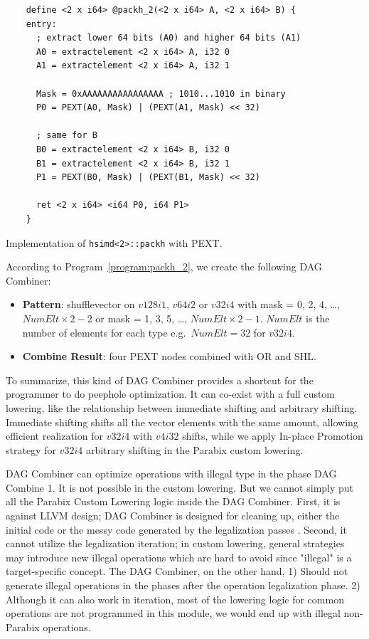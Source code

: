 \begin{program}[htbp!]
\begin{verbatim}
    define <2 x i64> @packh_2(<2 x i64> A, <2 x i64> B) {
    entry:
      ; extract lower 64 bits (A0) and higher 64 bits (A1)
      A0 = extractelement <2 x i64> A, i32 0
      A1 = extractelement <2 x i64> A, i32 1

      Mask = 0xAAAAAAAAAAAAAAAA ; 1010...1010 in binary
      P0 = PEXT(A0, Mask) | (PEXT(A1, Mask) << 32)

      ; same for B
      B0 = extractelement <2 x i64> B, i32 0
      B1 = extractelement <2 x i64> B, i32 1
      P1 = PEXT(B0, Mask) | (PEXT(B1, Mask) << 32)

      ret <2 x i64> <i64 P0, i64 P1>
    }
\end{verbatim}
\caption{Implementation of {\tt hsimd<2>::packh} with PEXT.}
\label{program:packh_2}
\end{program}

According to Program~\ref{program:packh_2}, we create the following DAG Combiner:
\begin{itemize}
    \item \textbf{Pattern}: shufflevector on $v128i1$, $v64i2$ or $v32i4$ with mask = 0, 2, 4, \ldots, $NumElt \times 2-2$ or mask = 1, 3, 5, \ldots, $NumElt \times 2 -1$. $NumElt$ is the number of elements for each type e.g.\ $NumElt=32$ for $v32i4$.
    \item \textbf{Combine Result}: four PEXT nodes combined with OR and SHL.
\end{itemize}

To summarize, this kind of DAG Combiner provides a shortcut for the programmer to do peephole optimization. It can co-exist with a full custom lowering, like the relationship between immediate shifting and arbitrary shifting. Immediate shifting shifts all the vector elements with the same amount, allowing efficient realization for $v32i4$ with $v4i32$ shifts, while we apply In-place Promotion strategy for $v32i4$ arbitrary shifting in the Parabix custom lowering.

DAG Combiner can optimize operations with illegal type in the phase DAG Combine 1. It is not possible in the custom lowering. But we cannot simply put all the Parabix Custom Lowering logic inside the DAG Combiner. First, it is against LLVM design; DAG Combiner is designed for cleaning up, either the initial code or the messy code generated by the legalization passes \cite{llvm_code_gen}. Second, it cannot utilize the legalization iteration; in custom lowering, general strategies may introduce new illegal operations which are hard to avoid since "illegal" is a target-specific concept. The DAG Combiner, on the other hand, 1) Should not generate illegal operations in the phases after the operation legalization phase. 2) Although it can also work in iteration, most of the lowering logic for common operations are not programmed in this module, we would end up with illegal non-Parabix operations.

